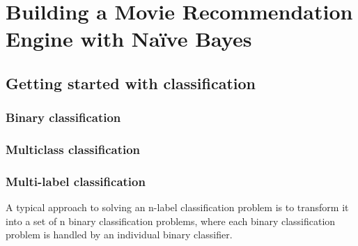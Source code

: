 \chapter{Building a Movie Recommendation Engine with Naïve Bayes\label{Ch02}}
\section{Getting started with classification}
\subsection{Binary classification}
\subsection{Multiclass classification}
\subsection{Multi-label classification}
A typical approach to solving an n-label classification problem is to transform it into a set of n binary classification problems, where each binary classification problem is handled by an individual binary classifier.